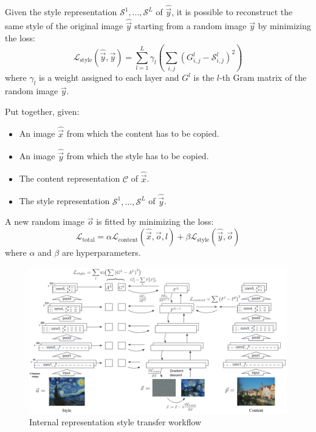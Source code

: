 \begin{description}
\begin{descriptionlist}
                Given the style representation $\mathcal{S}^1, \dots, \mathcal{S}^L$ of $\hat{\vec{y}}$,
                it is possible to reconstruct the same style of the original image $\hat{\vec{y}}$ starting from a random image $\vec{y}$ by minimizing the loss:
                \[ \mathcal{L}_\text{style}(\hat{\vec{y}}, \vec{y}) = \sum_{l=1}^{L} \gamma_l \left(\sum_{i,j} (G^l_{i, j} - \mathcal{S}^l_{i,j})^2 \right) \]
                where $\gamma_l$ is a weight assigned to each layer and $G^l$ is the $l$-th Gram matrix of the random image $\vec{y}$.
        \end{descriptionlist}
        
        Put together, given:
        \begin{itemize}
            \item An image $\hat{\vec{x}}$ from which the content has to be copied.
            \item An image $\hat{\vec{y}}$ from which the style has to be copied.
            \item The content representation $\mathcal{C}$ of $\hat{\vec{x}}$.
            \item The style representation $\mathcal{S}^1, \dots, \mathcal{S}^L$ of $\hat{\vec{y}}$.
        \end{itemize}
        A new random image $\vec{o}$ is fitted by minimizing the loss:
        \[ \mathcal{L}_\text{total} = \alpha \mathcal{L}_\text{content}(\hat{\vec{x}}, \vec{o}, l) + \beta \mathcal{L}_\text{style}(\hat{\vec{y}}, \vec{o}) \]
        where $\alpha$ and $\beta$ are hyperparameters.
        
        \begin{figure}[H]
            \centering
            \includegraphics[width=0.95\linewidth]{./img/style_transfer.png}
            \caption{Internal representation style transfer workflow}
        \end{figure}


\end{description}
